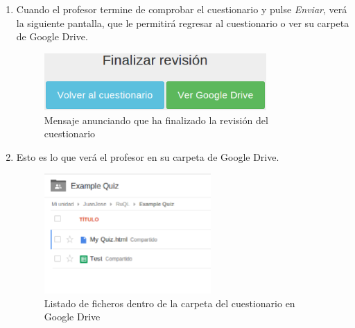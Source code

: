 \begin{enumerate}
  \item Cuando el profesor termine de comprobar el cuestionario y pulse \textit{Enviar}, ver\'a la siguiente pantalla, que le permitir\'a regresar al cuestionario o ver
  su carpeta de Google Drive.
  \begin{figure}[!th]
  \begin{center}
  \includegraphics[width=0.8\textwidth]{images/app9.eps}
  \caption{Mensaje anunciando que ha finalizado la revisi\'on del cuestionario}
  \label{fig:app9}
  \end{center}
  \end{figure}

  \item Esto es lo que ver\'a el profesor en su carpeta de Google Drive.
  \begin{figure}[!th]
  \begin{center}
  \includegraphics[width=0.6\textwidth]{images/app10.eps}
  \caption{Listado de ficheros dentro de la carpeta del cuestionario en Google Drive}
  \label{fig:app10}
  \end{center}
  \end{figure}
  \newpage


\end{enumerate}
